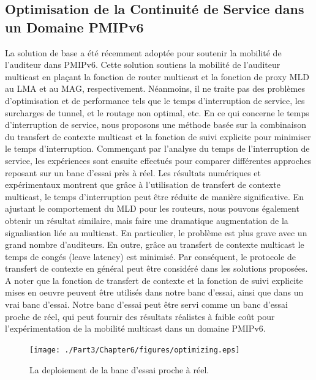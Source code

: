 \subsection{Optimisation de la Continuité de Service dans un Domaine PMIPv6}
La solution de base a été récemment adoptée pour soutenir la mobilité de l'auditeur dans PMIPv6. Cette solution soutiens la mobilité de l'auditeur multicast en plaçant la fonction de router multicast et la fonction de proxy MLD au LMA et au MAG, respectivement. Néanmoins, il ne traite pas des problèmes d'optimisation et de performance tels que le temps d'interruption de service, les surcharges de tunnel, et le routage non optimal, etc. En ce qui concerne le temps d'interruption de service, nous proposons une méthode basée sur la combinaison du transfert de contexte multicast et la fonction de suivi explicite pour minimiser le temps d'interruption. Commençant par l'analyse du temps de l'interruption de service, les expériences sont ensuite effectués pour comparer différentes approches reposant sur un banc d'essai près à réel. Les résultats numériques et expérimentaux montrent que grâce à l'utilisation de transfert de contexte multicast, le temps d'interruption peut être réduite de manière significative. En ajustant le comportement du MLD pour les routeurs, nous pouvons également obtenir un résultat similaire, mais faire une dramatique augmentation de la signalisation liée au multicast. En particulier, le problème est plus grave avec un grand nombre d'auditeurs. En outre, grâce au transfert de contexte multicast le temps de congés (leave latency) est minimisé. Par conséquent, le protocole de transfert de contexte en général peut être considéré dans les solutions proposées. A noter que la fonction de transfert de contexte et la fonction de suivi explicite mises en oeuvre peuvent être utilisés dans notre banc d'essai, ainsi que dans un vrai banc d'essai. Notre banc d'essai peut être servi comme un banc d'essai proche de réel, qui peut fournir des résultats réalistes à faible coût pour l'expérimentation de la mobilité multicast dans un domaine PMIPv6.

\begin{figure}[h!] 
 \begin{center} 
 \texttt{[image: ./Part3/Chapter6/figures/optimizing.eps]} 
    \caption{La deploiement de la banc d'essai proche à réel.}
     \label{fig:c5_architecture}
  \end{center} 
\end{figure}

